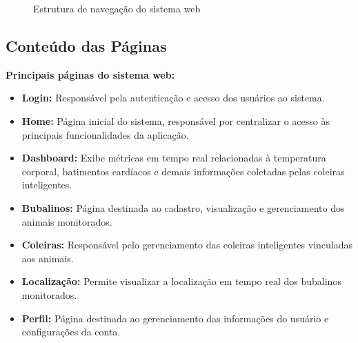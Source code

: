 \documentclass[11pt,a4paper]{article}
\begin{document}
\begin{figure}[H]
\centering
{}

\caption{Estrutura de navegação do sistema web}
\label{fig:sitemap}
\end{figure}

\subsection{Conteúdo das Páginas}

\textbf{Principais páginas do sistema web:}

\begin{itemize}
 \item \textbf{Login:} Responsável pela autenticação e acesso dos usuários ao sistema.

    \item \textbf{Home:} Página inicial do sistema, responsável por centralizar o acesso às principais funcionalidades da aplicação.

    \item \textbf{Dashboard:} Exibe métricas em tempo real relacionadas à temperatura corporal, batimentos cardíacos e demais informações coletadas pelas coleiras inteligentes.

    \item \textbf{Bubalinos:} Página destinada ao cadastro, visualização e gerenciamento dos animais monitorados.

    \item \textbf{Coleiras:} Responsável pelo gerenciamento das coleiras inteligentes vinculadas aos animais.

    \item \textbf{Localização:} Permite visualizar a localização em tempo real dos bubalinos monitorados.

    \item \textbf{Perfil:} Página destinada ao gerenciamento das informações do usuário e configurações da conta.

\end{itemize}
\end{document}
